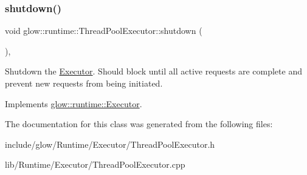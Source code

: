\subsubsection{\texorpdfstring{shutdown()}{shutdown()}}
{\footnotesize\ttfamily void glow\+::runtime\+::\+Thread\+Pool\+Executor\+::shutdown (\begin{DoxyParamCaption}{ }\end{DoxyParamCaption})\hspace{0.3cm}{\ttfamily [override]}, {\ttfamily [virtual]}}

Shutdown the \hyperlink{classglow_1_1runtime_1_1_executor}{Executor}. Should block until all active requests are complete and prevent new requests from being initiated. 

Implements \hyperlink{classglow_1_1runtime_1_1_executor_a2cbbc3a3fef585aed34aba34def2318a}{glow\+::runtime\+::\+Executor}.



The documentation for this class was generated from the following files\+:\begin{DoxyCompactItemize}
\item 
include/glow/\+Runtime/\+Executor/Thread\+Pool\+Executor.\+h\item 
lib/\+Runtime/\+Executor/Thread\+Pool\+Executor.\+cpp\end{DoxyCompactItemize}
